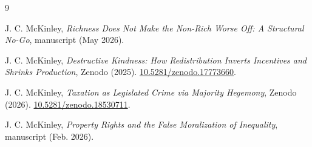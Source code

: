 \documentclass[11pt]{article}
\begin{document}
\begin{thebibliography}{9}

J. C. McKinley, \emph{Richness Does Not Make the Non-Rich Worse Off: A Structural No-Go}, manuscript (May 2026).

J. C. McKinley, \emph{Destructive Kindness: How Redistribution Inverts Incentives and Shrinks Production}, Zenodo (2025). \href{https://doi.org/10.5281/zenodo.17773660}{10.5281/zenodo.17773660}.

J. C. McKinley, \emph{Taxation as Legislated Crime via Majority Hegemony}, Zenodo (2026). \href{https://doi.org/10.5281/zenodo.18530711}{10.5281/zenodo.18530711}.

J. C. McKinley, \emph{Property Rights and the False Moralization of Inequality}, manuscript (Feb. 2026).

\end{thebibliography}
\end{document}
